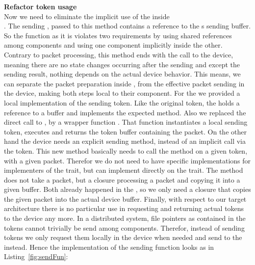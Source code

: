 \textbf{Refactor token usage}\\
Now we need to eliminate the implicit use of the \dev{} inside \\. The sending , passed to this method contains a reference to the \dev{}s sending buffer. So the function as it is violates two requirements by using shared references among components and using one component implicitly inside the other.
Contrary to packet processing, this method ends with the call to the device, meaning there are no state changes occurring after the sending and except the sending result, nothing depends on the actual device behavior. This means, we can separate the packet preparation inside , from the effective packet sending in the device, making both steps local to their component. For the \stack{} we provided a local implementation of the sending token. Like the original token, the  holds a reference to a buffer and implements the expected  method. Also we replaced the direct call to , by a wrapper function . That function instantiates a local sending token, executes  and returns the token buffer
containing the packet. On the other hand the device needs an explicit sending method, instead of an implicit call via the token. This new  method basically needs to call the  method on a given token, with a given packet. Therefor we do not need to have specific implementations for implementers of the  trait, but can implement  directly on the trait. The method  does not take a packet, but a closure processing a packet and copying it into a given buffer. Both already happened in the \stack, so we only need a closure that copies the given packet into the actual device buffer. Finally, with respect to our target architecture there is no particular use in requesting and returning actual tokens to the device any more. In a distributed system, file pointers as contained in the tokens cannot trivially be send among components. Therefor, instead of sending tokens we only request them locally in the device when needed and send  to the \stack{} instead. Hence the implementation of the sending function looks as in Listing~\ref{fig:sendFun}:

